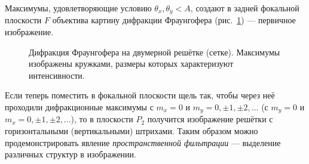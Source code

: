 \documentclass[a4paper, 12pt]{article}
\begin{document}
	Максимумы, удовлетворяющие условию $\theta_x, \theta_y < A$, создают в задней фокальной плоскости $F$ объектива картину дифракции Фраунгофера (рис.~\ref{ris:max}) --- первичное изображение.
	\begin{figure}[H]
		\caption{Дифракция Фраунгофера на двумерной решётке (сетке). Максимумы изображены кружками, размеры которых характеризуют интенсивности.}
		\label{ris:max}
	\end{figure}
	
	Если теперь поместить в фокальной плоскости щель так, чтобы через неё проходили дифракционные максимумы с $m_x = 0$ и $m_y =0, \pm 1, \pm 2, ...$ (с $m_y = 0$ и $m_x =0, \pm 1, \pm 2, ...$), то в плоскости $P_2$ получится изображение решётки с горизонтальными (вертикальными) штрихами. Таким образом можно продемонстрировать явление \textit{пространственной фильтрации} --- выделение различных структур в изображении.
\end{document}
